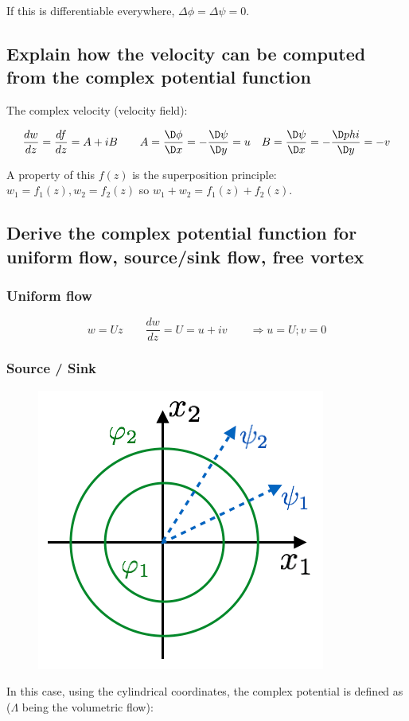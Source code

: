 \documentclass[british,french,11pt, a4paper, openany]{article}
\begin{document}
If this is differentiable everywhere, $\Delta \phi = \Delta \psi = 0$. 

\subsection{Explain how the velocity can be computed from the complex potential	function}

The complex velocity (velocity field):

\begin{equation}
\frac{dw}{dz} = \frac{df}{dz} = A + iB \qquad A = \frac{\D \phi}{\D x} = - \frac{\D \psi}{\D y} = u \quad B = \frac{\D \psi}{\D x} = - \frac{\D phi}{\D y} = -v
\end{equation}

A property of this $f(z)$ is the superposition principle: $w_1 = f_1(z), w_2 = f_2(z)$ so $w_1 + w_2 = f_1(z)+f_2(z)$.
\subsection{Derive the complex potential function for uniform flow, source/sink flow, free vortex}
\subsubsection{Uniform flow}

\begin{equation}
w = U z \qquad \frac{d w}{dz} = U = u+iv \qquad \Rightarrow u = U; v = 0
\end{equation}

\subsubsection{Source / Sink}
\begin{figure}
	\vspace{-5mm}
	\includegraphics[scale=0.3]{ch2/25}
\end{figure}
In this case, using the cylindrical coordinates, the complex potential is defined as ($\Lambda$ being the volumetric flow): 
\end{document}
